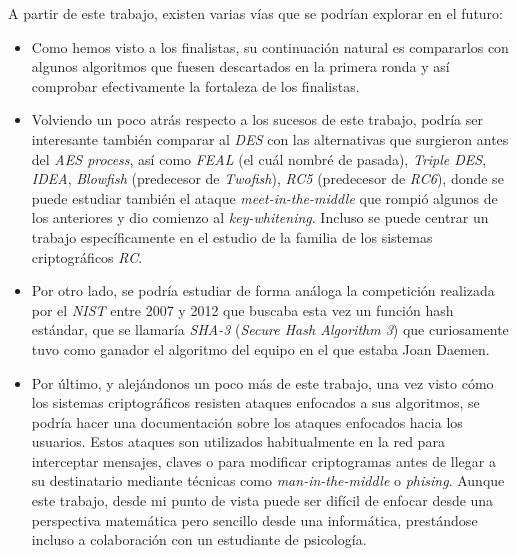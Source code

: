 A partir de este trabajo, existen varias vías que se podrían explorar en el futuro:
\begin{itemize}
\item Como hemos visto a los finalistas, su continuación natural es compararlos con algunos algoritmos que fuesen descartados en la primera ronda y así comprobar efectivamente la fortaleza de los finalistas.

\item Volviendo un poco atrás respecto a los sucesos de este trabajo, podría ser interesante también comparar al \textit{DES} con las alternativas que surgieron antes del \textit{AES process}, así como \textit{FEAL} (el cuál nombré de pasada), \textit{Triple DES}, \textit{IDEA}, \textit{Blowfish} (predecesor de \textit{Twofish}), \textit{RC5} (predecesor de \textit{RC6}), donde se puede estudiar también el ataque \textit{meet-in-the-middle} que rompió algunos de los anteriores y dio comienzo al \textit{key-whitening}. Incluso se puede centrar un trabajo específicamente en el estudio de la familia de los sistemas criptográficos \textit{RC}.

\item Por otro lado, se podría estudiar de forma análoga la competición realizada por el \textit{NIST} entre 2007 y 2012 que buscaba esta vez un función hash estándar, que se llamaría \textit{SHA-3} (\textit{Secure Hash Algorithm 3}) que curiosamente tuvo como ganador el algoritmo del equipo en el que estaba Joan Daemen.

\item Por último, y alejándonos un poco más de este trabajo, una vez visto cómo los sistemas criptográficos resisten ataques enfocados a sus algoritmos, se podría hacer una documentación sobre los ataques enfocados hacia los usuarios. Estos ataques son utilizados habitualmente en la red para interceptar mensajes, claves o para modificar criptogramas antes de llegar a su destinatario mediante técnicas como \textit{man-in-the-middle} o \textit{phising}. Aunque este trabajo, desde mi punto de vista puede ser difícil de enfocar desde una perspectiva matemática pero sencillo desde una informática, prestándose incluso a colaboración con un estudiante de psicología.
\end{itemize}
